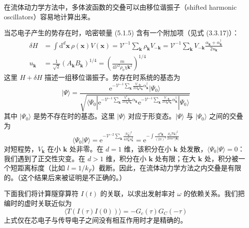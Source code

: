 \begin{keypoints}
\item 在流体动力学方法中，多体波函数的交叠可以由移位谐振子（shifted harmonic oscillators）容易地计算出来。
\end{keypoints}

当芯电子产生的势存在时，哈密顿量 (5.1.5) 含有一个附加项（见式 (3.3.17)）：
\begin{align*}
\delta H &= \int\mathrm{d}^d\pmb{x}\,\rho(\pmb{x})V(\pmb{x})=\mathcal{V}^{-1}\sum_{\pmb{k}}\rho_{\pmb{k}}V_{-\pmb{k}}=\mathcal{V}^{-1}\sum_{\pmb{k}}V_{-\pmb{k}}\frac{\alpha_{\pmb{k}}+\alpha_{\pmb{k}}^{\dagger}}{2u_{\pmb{k}}}\\
u_{\pmb{k}} &= \frac{1}{\sqrt{2}}(A_{\pmb{k}}B_{\pmb{k}})^{1/4}=\left(\frac{m}{4\mathcal{V}^2\rho_0\chi\pmb{k}^2}\right)^{1/4}
\end{align*}
这里 $H+\delta H$ 描述一组移位谐振子。势存在时系统的基态为
\begin{equation*}
|\Psi\rangle=\frac{\mathrm{e}^{-\mathcal{V}^{-1}\sum_{\pmb{k}}\frac{V_{-\pmb{k}}}{2\Omega_{\pmb{k}}u_{\pmb{k}}}\alpha_{\pmb{k}}^{\dagger}}|\Psi_0\rangle}
{\sqrt{\langle\Psi_0|\mathrm{e}^{-\mathcal{V}^{-1}\sum_{\pmb{k}}\frac{V^{*}_{-\pmb{k}}}{2\Omega_{\pmb{k}}u_{\pmb{k}}}\alpha_{\pmb{k}}}\mathrm{e}^{-\mathcal{V}^{-1}\sum_{\pmb{k}}\frac{V_{-\pmb{k}}}{2\Omega_{\pmb{k}}u_{\pmb{k}}}\alpha_{\pmb{k}}^{\dagger}}|\Psi_0\rangle}}
\end{equation*}
其中 $|\Psi_0\rangle$ 是势不存在时的基态。这里 $|\Psi\rangle$ 对应于形变态。$|\Psi\rangle$ 与 $|\Psi_0\rangle$ 之间的交叠为
\begin{equation*}
\langle\Psi_0|\Psi\rangle=\mathrm{e}^{-\mathcal{V}^{-2}\sum_{\pmb{k}}\frac{|V_{\pmb{k}}|^2}{4\Omega_{\pmb{k}}^2u_{\pmb{k}}^2}}=\mathrm{e}^{-\int\frac{\mathrm{d}^d\pmb{k}}{(2\pi)^d}\frac{\rho_0|V_{\pmb{k}}|^2}{2mv^3|\pmb{k}|}}
\end{equation*}
对短程势，$V_{\pmb{k}}$ 在小 $\pmb{k}$ 处非零。在 $d=1$ 维，该积分在小 $\pmb{k}$ 处发散，$\langle\Psi_0|\Psi\rangle=0$：我们遇到了正交性灾变。在 $d>1$ 维，积分在小 $\pmb{k}$ 处有限；在大 $\pmb{k}$ 处，积分被一个短距离标度（比如 $l=1/k_F$）截断。因此，在流体动力学方法之内交叠是有限的。（这个结果后来被证明是不正确的。）

下面我们将计算隧穿算符 $I(t)$ 的关联，以求出发射率对 $\omega$ 的依赖关系。我们把编时的虚时关联近似为
\begin{equation*}
\langle T(I(\tau)I(0))\rangle=-G_c(\tau)G_C(-\tau)\tag{5.1.6}
\end{equation*}
上式仅在芯电子与传导电子之间没有相互作用时才是精确的。

